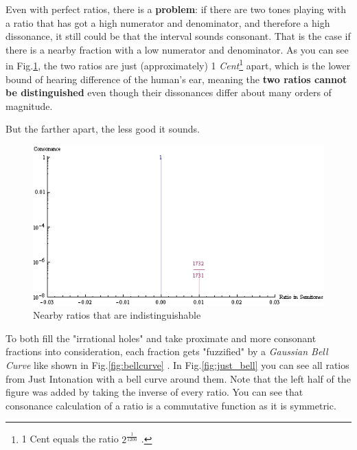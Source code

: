 \documentclass[12pt,a4paper,titlepage,oneside]{report}
\begin{document}
Even with perfect ratios, there is a \textbf{problem}: if there are two tones playing with a ratio that has got a high numerator and denominator, and therefore a high dissonance, it still could be that the interval sounds consonant. That is the case if there is a nearby fraction with a low numerator and denominator. As you can see in Fig.\ref{fig:enharmonic}, the two ratios are just (approximately) 1 \textit{Cent}\footnote{1 Cent equals the ratio $2^{\frac{1}{1200}}$ \cite{bib:cent}.} apart, which is the lower bound of hearing difference of the human's ear, meaning the \textbf{two ratios cannot be distinguished} even though their dissonances differ about many orders of magnitude.

\noindent
{}

But the farther apart, the less good it sounds.

\begin{figure}[!ht]
\includegraphics[width=\textwidth]{images/enharmonic.png}
\centering
\caption{Nearby ratios that are indistinguishable}
\label{fig:enharmonic}
\end{figure}

To both fill the "irrational holes" and take proximate and more consonant fractions into consideration, each fraction gets "fuzzified" by a \textit{Gaussian Bell Curve} like shown in Fig.\ref{fig:bellcurve} \cite{bib:bell}. In Fig.\ref{fig:just_bell} you can see all ratios from Just Intonation with a bell curve around them. Note that the left half of the figure was added by taking the inverse of every ratio. You can see that consonance calculation of a ratio is a commutative function as it is symmetric.
\end{document}
